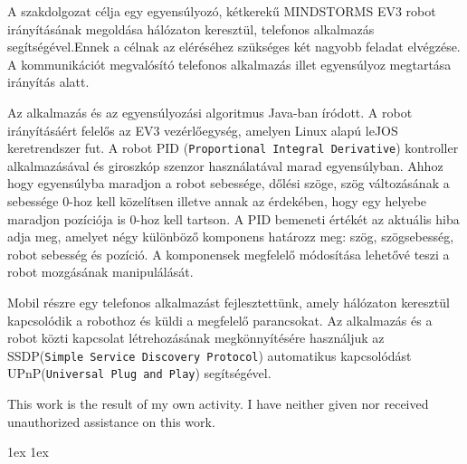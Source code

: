 \documentclass[final]{ubb_dolgozat}
\author{
Márton Zete-Örs
}
\begin{document}
\begin{abstractEN}
	
A szakdolgozat célja egy egyensúlyozó, kétkerekű MINDSTORMS EV3 robot irányításának megoldása hálózaton keresztül, telefonos alkalmazás segítségével.Ennek a célnak az eléréséhez szükséges két nagyobb feladat elvégzése. A kommunikációt megvalósító telefonos alkalmazás illet egyensúlyoz megtartása irányítás alatt.

Az alkalmazás és az egyensúlyozási algoritmus Java-ban íródott. A robot irányításáért felelős az EV3 vezérlőegység, amelyen Linux alapú leJOS keretrendszer fut. A robot PID (\texttt{Proportional Integral Derivative}) kontroller alkalmazásával és giroszkóp szenzor használatával marad egyensúlyban. Ahhoz hogy egyensúlyba maradjon a robot sebessége, dőlési szöge, szög változásának a sebessége 0-hoz kell közelítsen illetve annak az érdekében, hogy egy helyebe maradjon pozíciója is 0-hoz kell tartson.
A PID bemeneti értékét az aktuális hiba adja meg, amelyet négy különböző komponens határozz meg: szög, szögsebesség, robot sebesség és pozíció. A komponensek megfelelő módosítása lehetővé teszi a robot mozgásának manipulálását. 

Mobil részre egy telefonos alkalmazást fejlesztettünk, amely hálózaton keresztül kapcsolódik a robothoz és küldi a megfelelő parancsokat. Az alkalmazás és a robot közti kapcsolat létrehozásának megkönnyítésére használjuk az SSDP(\texttt{Simple Service Discovery Protocol}) automatikus kapcsolódást UPnP(\texttt{Universal Plug and Play}) segítségével. 

This work is the result of my own activity. I have neither given nor received unauthorized assistance on this work.

\end{abstractEN}

\maketitle

{ \baselineskip 1ex
  \parskip 1ex
  \tableofcontents
}





%
%
%
\appendix

{ 
	\renewcommand{\baselinestretch}{1.1}\normalsize %
	\setlength{\itemsep}{-2.4mm}
	\setlength{\bibspacing}{0.67\baselineskip}
	
	
}
\end{document}
